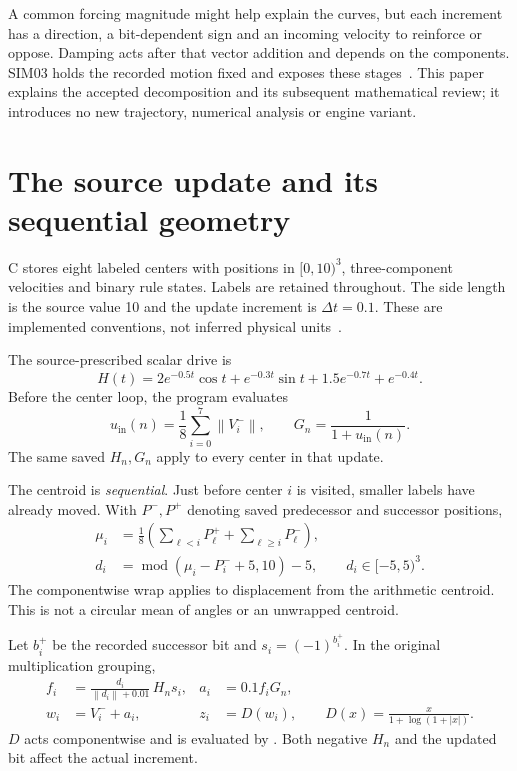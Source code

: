 \documentclass[11pt,a4paper]{article}
\newcommand{\norm}[1]{\left\lVert #1\right\rVert}
\newcommand{\inc}{\mathrm{in}}
\newcommand{\src}[1]{\texttt{\detokenize{#1}}}
\begin{document}
A common forcing magnitude might help explain the curves, but each increment has a direction, a bit-dependent sign and an incoming velocity to reinforce or oppose. Damping acts after that vector addition and depends on the components. SIM03 holds the recorded motion fixed and exposes these stages~\cite{report,review}. This paper explains the accepted decomposition and its subsequent mathematical review; it introduces no new trajectory, numerical analysis or engine variant.

\clearpage
\section{The source update and its sequential geometry}
\label{sec:source}
C stores eight labeled centers with positions in $[0,10)^3$, three-component velocities and binary rule states. Labels are retained throughout. The side length is the source value 10 and the update increment is $\Delta t=0.1$. These are implemented conventions, not inferred physical units~\cite{source}.

The source-prescribed scalar drive is
\begin{equation}
H(t)=2e^{-0.5t}\cos t+e^{-0.3t}\sin t+1.5e^{-0.7t}+e^{-0.4t}.
\label{eq:drive}
\end{equation}
Before the center loop, the program evaluates
\begin{equation}
u_{\inc}(n)=\frac18\sum_{i=0}^7\norm{V^-_i},
\qquad G_n=\frac{1}{1+u_{\inc}(n)}.
\label{eq:gain}
\end{equation}
The same saved $H_n,G_n$ apply to every center in that update.

The centroid is \emph{sequential}. Just before center $i$ is visited, smaller labels have already moved. With $P^-,P^+$ denoting saved predecessor and successor positions,
\begin{align}
\mu_i&=\frac18\left(\sum_{\ell<i}P^+_\ell+\sum_{\ell\ge i}P^-_\ell\right),
\label{eq:centroid}\\
d_i&=\operatorname{mod}(\mu_i-P^-_i+5,10)-5,\qquad d_i\in[-5,5)^3.
\label{eq:displacement}
\end{align}
The componentwise wrap applies to displacement from the arithmetic centroid. This is not a circular mean of angles or an unwrapped centroid.

Let $b_i^+$ be the recorded successor bit and $s_i=(-1)^{b_i^+}$. In the original multiplication grouping,
\begin{align}
f_i&=\frac{d_i}{\norm{d_i}+0.01}\,H_n s_i,
& a_i&=0.1 f_iG_n,
\label{eq:impulse}\\
w_i&=V_i^-+a_i,
&z_i&=D(w_i),\qquad D(x)=\frac{x}{1+\log(1+|x|)}.
\label{eq:damping}
\end{align}
$D$ acts componentwise and is evaluated by \src{np.log1p}. Both negative $H_n$ and the updated bit affect the actual increment.
\end{document}
